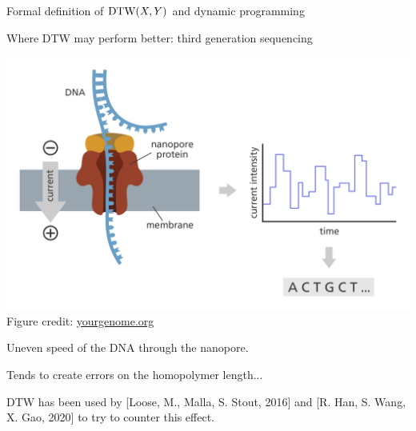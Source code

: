 \begin{frame}{Formal definition of $\mathrm{DTW}(X,Y)$ and dynamic programming}


\end{frame}


\begin{frame}{Where DTW may perform better: third generation sequencing}
    \begin{center}
    \includegraphics[scale=0.25]{figures/ont-sequencing_yourgenome.png}\\
    \footnotesize{Figure credit: \href{https://www.yourgenome.org/facts/what-is-oxford-nanopore-technology-ont-sequencing/}{yourgenome.org}}
    \end{center}
    
    Uneven speed of the DNA through the nanopore.\pause
    
    Tends to create errors on the homopolymer length...\pause
    
    DTW has been used by [Loose, M., Malla, S. Stout, 2016] and [R. Han, S. Wang, X. Gao, 2020] to try to counter this effect.
    
\end{frame}

